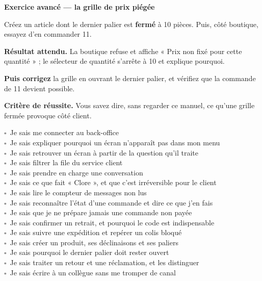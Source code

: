 \documentclass[11pt,a4paper]{report}
\newcommand{\case}{$\square$~}
\begin{document}
\begin{exercice}
\textbf{Exercice avancé — la grille de prix piégée}

\medskip
Créez un article dont le dernier palier est \textbf{fermé} à 10 pièces. Puis,
côté boutique, essayez d'en commander 11.

\medskip
\textbf{Résultat attendu.} La boutique refuse et affiche « Prix non fixé pour
cette quantité » ; le sélecteur de quantité s'arrête à 10 et explique pourquoi.

\medskip
\textbf{Puis corrigez} la grille en ouvrant le dernier palier, et vérifiez que
la commande de 11 devient possible.

\medskip
\textbf{Critère de réussite.} Vous savez dire, sans regarder ce manuel, ce
qu'une grille fermée provoque côté client.
\end{exercice}

\begin{checklist}
\case Je sais me connecter au back-office\\
\case Je sais expliquer pourquoi un écran n'apparaît pas dans mon menu\\
\case Je sais retrouver un écran à partir de la question qu'il traite\\
\case Je sais filtrer la file du service client\\
\case Je sais prendre en charge une conversation\\
\case Je sais ce que fait « Clore », et que c'est irréversible pour le client\\
\case Je sais lire le compteur de messages non lus\\
\case Je sais reconnaître l'état d'une commande et dire ce que j'en fais\\
\case Je sais que je ne prépare jamais une commande non payée\\
\case Je sais confirmer un retrait, et pourquoi le code est indispensable\\
\case Je sais suivre une expédition et repérer un colis bloqué\\
\case Je sais créer un produit, ses déclinaisons et ses paliers\\
\case Je sais pourquoi le dernier palier doit rester ouvert\\
\case Je sais traiter un retour et une réclamation, et les distinguer\\
\case Je sais écrire à un collègue sans me tromper de canal
\end{checklist}

\end{document}
